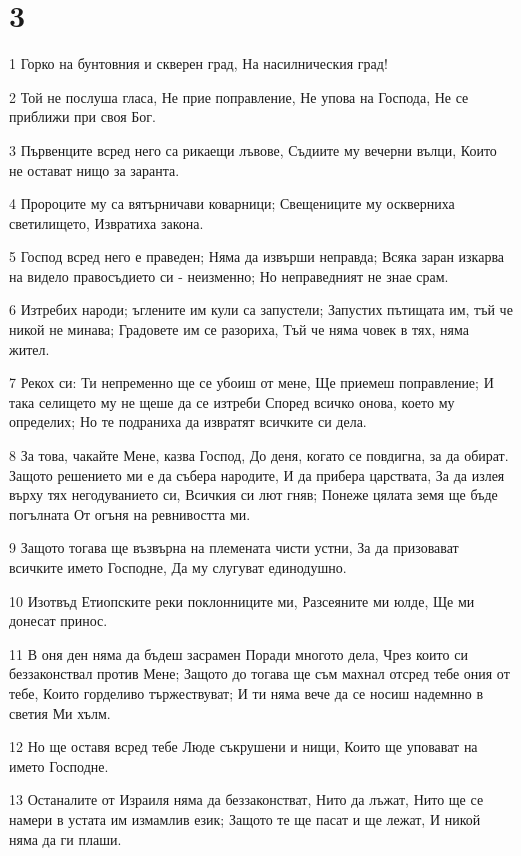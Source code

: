 \chapter{3}

\par 1 Горко на бунтовния и скверен град, На насилническия град!
\par 2 Той не послуша гласа, Не прие поправление, Не упова на Господа, Не се приближи при своя Бог.
\par 3 Първенците всред него са рикаещи лъвове, Съдиите му вечерни вълци, Които не остават нищо за заранта.
\par 4 Пророците му са вятърничави коварници; Свещениците му оскверниха светилището, Извратиха закона.
\par 5 Господ всред него е праведен; Няма да извърши неправда; Всяка заран изкарва на видело правосъдието си - неизменно; Но неправедният не знае срам.
\par 6 Изтребих народи; ъглените им кули са запустели; Запустих пътищата им, тъй че никой не минава; Градовете им се разориха, Тъй че няма човек в тях, няма жител.
\par 7 Рекох си: Ти непременно ще се убоиш от мене, Ще приемеш поправление; И така селището му не щеше да се изтреби Според всичко онова, което му определих; Но те подраниха да извратят всичките си дела.
\par 8 За това, чакайте Мене, казва Господ, До деня, когато се повдигна, за да обират. Защото решението ми е да събера народите, И да прибера царствата, За да излея върху тях негодуванието си, Всичкия си лют гняв; Понеже цялата земя ще бъде погълната От огъня на ревнивостта ми.
\par 9 Защото тогава ще възвърна на племената чисти устни, За да призовават всичките името Господне, Да му слугуват единодушно.
\par 10 Изотвъд Етиопските реки поклонниците ми, Разсеяните ми юлде, Ще ми донесат принос.
\par 11 В оня ден няма да бъдеш засрамен Поради многото дела, Чрез които си беззаконствал против Мене; Защото до тогава ще съм махнал отсред тебе ония от тебе, Които горделиво тържествуват; И ти няма вече да се носиш надемнно в светия Ми хълм.
\par 12 Но ще оставя всред тебе Люде съкрушени и нищи, Които ще уповават на името Господне.
\par 13 Останалите от Израиля няма да беззаконстват, Нито да лъжат, Нито ще се намери в устата им измамлив език; Защото те ще пасат и ще лежат, И никой няма да ги плаши.
